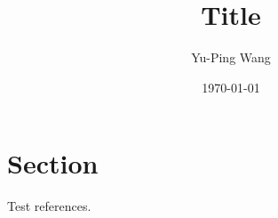 \documentclass{article}
\title{Title}
\author{Yu-Ping Wang}
\date{\today}
\numberwithin{equation}{section}
\renewcommand{\[}{\begin{equation}}
\renewcommand{\]}{\end{equation}}
\begin{document}
\maketitle
\tableofcontents

\section{Section}
Test references. \cite{Hatsuda:2023dwx}

\printbibliography
\end{document}
